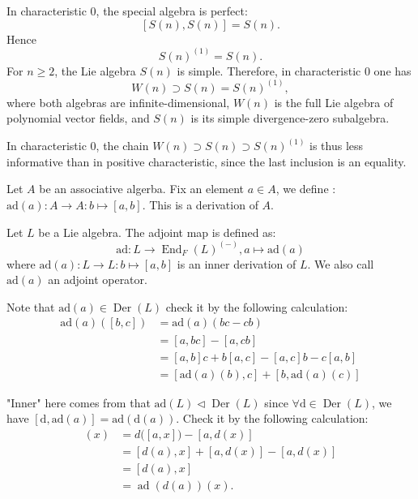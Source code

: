 \documentclass[11pt, a4paper]{report}
\begin{document}
In characteristic $0$, the special algebra is perfect:
\[
[S(n),S(n)]=S(n).
\]
Hence
\[
S(n)^{(1)}=S(n).
\]
For $n\ge 2$, the Lie algebra $S(n)$ is simple. Therefore, in characteristic
$0$ one has
\[
W(n)\supset S(n)=S(n)^{(1)},
\]
where both algebras are infinite-dimensional, $W(n)$ is the full Lie algebra of
polynomial vector fields, and $S(n)$ is its simple divergence-zero subalgebra.

\begin{remark}
    In characteristic $0$, the chain $W(n)\supset S(n)\supset S(n)^{(1)}$ is thus
less informative than in positive characteristic, since the last inclusion is an
equality.
\end{remark}

Let $A$ be an associative algerba. Fix an element $a \in A$, we define : $\mathrm{ad}(a): A \to A : b\mapsto [a,b]$. This is a derivation of $A$. 

\begin{definition}
    Let $L$ be a Lie algebra. The adjoint map is defined as:
    \[
    \mathrm{ad}: L \to \operatorname{End}_F(L)^{(-)}, a \mapsto \mathrm{ad}(a)
    \]
    where $\mathrm{ad}(a): L \to L : b\mapsto [a,b]$ is an inner derivation of $L$. We also call $\mathrm{ad}(a)$ an adjoint operator.
 \end{definition}

 Note that $\mathrm{ad}(a) \in \operatorname{Der}(L)$ check it by the following calculation:
 \begin{align*}
 \mathrm{ad}(a)([b,c])&=\mathrm{ad}(a)(bc-cb) \\
 &=[a,bc]-[a,cb] \\
 &=[a,b]c+b[a,c]-[a,c]b-c[a,b] \\
 &=[\mathrm{ad}(a)(b),c]+[b,\mathrm{ad}(a)(c)]
 \end{align*}

"Inner" here comes from that $\mathrm{ad}(L) \triangleleft \operatorname{Der}(L)$ since $\forall \mathrm{d} \in \operatorname{Der}(L)$, we have $[\mathrm{d},\mathrm{ad}(a)]=  \mathrm{ad}(\mathrm{d}(a))$. Check it by the following calculation:
\begin{align*}
    [d,\operatorname{ad}(a)](x)
    &= d\bigl([a,x]\bigr)-[a,d(x)] \\
    &= [d(a),x]+[a,d(x)]-[a,d(x)] \\
    &= [d(a),x] \\
    &= \operatorname{ad}(d(a))(x).
\end{align*}
\end{document}
